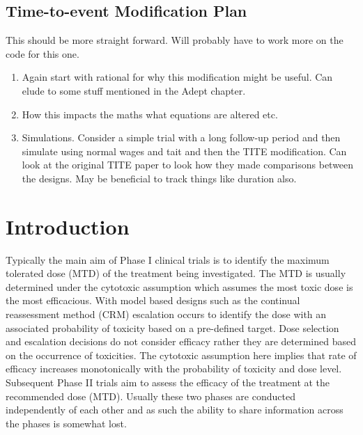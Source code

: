 \subsection{Time-to-event Modification Plan}
This should be more straight forward. Will probably have to work more on the code for this one. 

\begin{enumerate}
	\item Again start with rational for why this modification might be useful. Can elude to some stuff mentioned in the Adept chapter. 
	\item How this impacts the maths what equations are altered etc. 
	\item Simulations. Consider a simple trial with a long follow-up period and then simulate using normal wages and tait and then the TITE modification. Can look at the original TITE paper to look how they made comparisons between the designs. May be beneficial to track things like duration also. 
\end{enumerate}



\section{Introduction}
\label{WT:Introduction}

Typically the main aim of Phase \RN{1} clinical trials is to identify the maximum tolerated dose (MTD) of the treatment being investigated. The MTD is usually determined under the cytotoxic assumption which assumes the most toxic dose is the most efficacious. With model based designs such as the continual reassessment method (CRM) \cite{oquigleyContinualReassessmentMethod1990} escalation occurs to identify the dose with an associated probability of toxicity based on a pre-defined target. Dose selection and escalation decisions do not consider efficacy rather they are determined based on the occurrence of toxicities. The cytotoxic assumption here implies that rate of efficacy increases monotonically with the probability of toxicity and dose level. Subsequent Phase \RN{2} trials aim to assess the efficacy of the treatment at the recommended dose (MTD). Usually these two phases are conducted independently of each other and as such the ability to share information across the phases is somewhat lost. 

